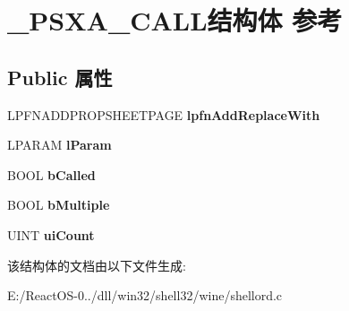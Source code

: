 \hypertarget{struct___p_s_x_a___c_a_l_l}{}\section{\+\_\+\+P\+S\+X\+A\+\_\+\+C\+A\+L\+L结构体 参考}
\label{struct___p_s_x_a___c_a_l_l}
\subsection*{Public 属性}
\begin{DoxyCompactItemize}
\item 
\mbox{\label{struct___p_s_x_a___c_a_l_l_a50de78626debe148acbfd4bde61d73f8}} 
L\+P\+F\+N\+A\+D\+D\+P\+R\+O\+P\+S\+H\+E\+E\+T\+P\+A\+GE {\bfseries lpfn\+Add\+Replace\+With}
\item 
\mbox{\label{struct___p_s_x_a___c_a_l_l_a50ece5ced239bf23aeac74c0a5581101}} 
L\+P\+A\+R\+AM {\bfseries l\+Param}
\item 
\mbox{\label{struct___p_s_x_a___c_a_l_l_ac97de03c213313d18d13522387fcd26c}} 
B\+O\+OL {\bfseries b\+Called}
\item 
\mbox{\label{struct___p_s_x_a___c_a_l_l_ad5ec82a351abd6213a10e4c7c9b8f46c}} 
B\+O\+OL {\bfseries b\+Multiple}
\item 
\mbox{\label{struct___p_s_x_a___c_a_l_l_afc5cce401301e268300c8d986b078071}} 
U\+I\+NT {\bfseries ui\+Count}
\end{DoxyCompactItemize}


该结构体的文档由以下文件生成\+:\begin{DoxyCompactItemize}
\item 
E\+:/\+React\+O\+S-\/0../dll/win32/shell32/wine/shellord.\+c\end{DoxyCompactItemize}

